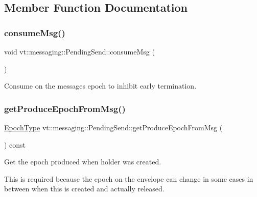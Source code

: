 \subsection{Member Function Documentation}
\mbox{\label{structvt_1_1messaging_1_1_pending_send_a0f249a127a798ba0823fae82c925ed3b}} 
\subsubsection{\texorpdfstring{consume\+Msg()}{consumeMsg()}}
{\footnotesize\ttfamily void vt\+::messaging\+::\+Pending\+Send\+::consume\+Msg (\begin{DoxyParamCaption}{ }\end{DoxyParamCaption})\hspace{0.3cm}{\ttfamily [private]}}



Consume on the messages epoch to inhibit early termination. 

\mbox{\label{structvt_1_1messaging_1_1_pending_send_a8293dffe4d8cdc81de573d2edf0ee4cb}} 
\subsubsection{\texorpdfstring{get\+Produce\+Epoch\+From\+Msg()}{getProduceEpochFromMsg()}}
{\footnotesize\ttfamily \hyperlink{namespacevt_a81d11b28122d43bf9834577e4a06440f}{Epoch\+Type} vt\+::messaging\+::\+Pending\+Send\+::get\+Produce\+Epoch\+From\+Msg (\begin{DoxyParamCaption}{ }\end{DoxyParamCaption}) const\hspace{0.3cm}{\ttfamily [private]}}



Get the epoch produced when holder was created. 

This is required because the epoch on the envelope can change in some cases in between when this is created and actually released.

